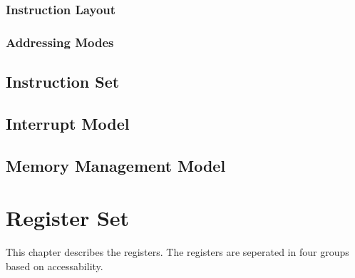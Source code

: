 \documentclass[oneside, a4paper]{memoir}
\begin{document}
\subsection{Instruction Layout}
\subsection{Addressing Modes}
\section{Instruction Set}
\section{Interrupt Model}
\section{Memory Management Model}

\chapter{Register Set}
This chapter describes the registers. The registers are seperated in four groups based on accessability.
\end{document}
